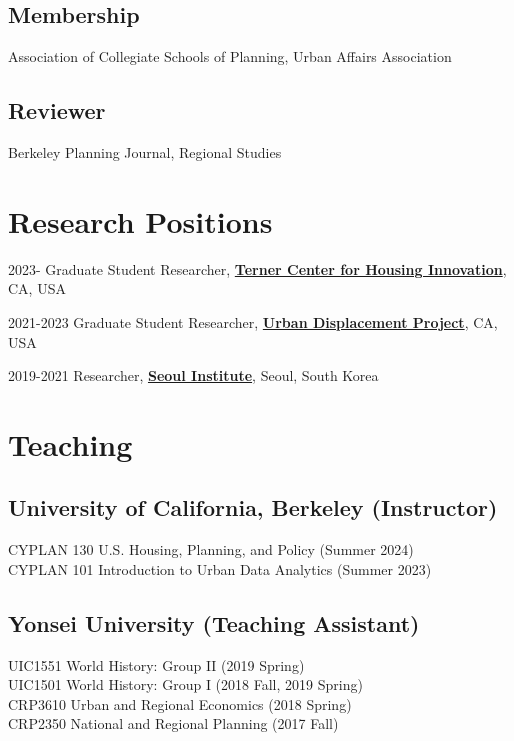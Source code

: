 \documentclass[12pt,letterpaper]{report}
\begin{document}
  \subsection*{Membership}
    Association of Collegiate Schools of Planning, Urban Affairs Association
  \subsection*{Reviewer}
    Berkeley Planning Journal, Regional Studies

    \section*{Research Positions}
    \begin{tablist}
        \item[2023-] \tab{}Graduate Student Researcher, \href{https://ternercenter.berkeley.edu/}{\textbf{Terner Center for Housing Innovation}}, CA, USA
        \item[2021-2023] \tab{}Graduate Student Researcher, \href{https://www.urbandisplacement.org/}{\textbf{Urban Displacement Project}}, CA, USA
        \item[2019-2021] \tab{}Researcher, \href{si.re.kr}{\textbf{Seoul Institute}}, Seoul, South Korea
    \end{tablist}

 \section*{Teaching}
    \subsection*{University of California, Berkeley (Instructor)}
      CYPLAN 130 U.S. Housing, Planning, and Policy (Summer 2024)\\
      CYPLAN 101 Introduction to Urban Data Analytics (Summer 2023)
    \subsection*{Yonsei University (Teaching Assistant)}
      UIC1551 World History: Group II (2019 Spring)\\
      UIC1501 World History: Group I  (2018 Fall, 2019 Spring)\\
      CRP3610 Urban and Regional Economics (2018 Spring)\\
      CRP2350 National and Regional Planning (2017 Fall)

  
\end{document}
